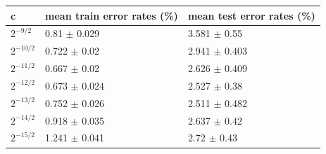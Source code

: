 \begin{tabular}{lll}
\toprule
c & mean train error rates (\%) & mean test error rates (\%) \\
\midrule
$2^{-9/2}$ & 0.81 $\pm$ 0.029 & 3.581 $\pm$ 0.55 \\
$2^{-10/2}$ & 0.722 $\pm$ 0.02 & 2.941 $\pm$ 0.403 \\
$2^{-11/2}$ & 0.667 $\pm$ 0.02 & 2.626 $\pm$ 0.409 \\
$2^{-12/2}$ & 0.673 $\pm$ 0.024 & 2.527 $\pm$ 0.38 \\
$2^{-13/2}$ & 0.752 $\pm$ 0.026 & 2.511 $\pm$ 0.482 \\
$2^{-14/2}$ & 0.918 $\pm$ 0.035 & 2.637 $\pm$ 0.42 \\
$2^{-15/2}$ & 1.241 $\pm$ 0.041 & 2.72 $\pm$ 0.43 \\
\bottomrule
\end{tabular}
